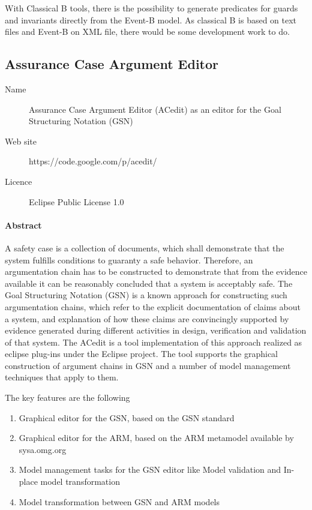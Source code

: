   With Classical B tools, there is the possibility to generate predicates for
  guards and invariants directly from the Event-B model. As classical B is based
  on text files and Event-B on XML file, there would be some development work to
  do.

\subsection{Assurance Case Argument Editor}

\begin{description}
\item[Name] Assurance Case Argument Editor (ACedit) as an editor for the Goal Structuring Notation (GSN)
\item[Web site] https://code.google.com/p/acedit/
\item[Licence] Eclipse Public License 1.0
\end{description}

\paragraph{Abstract}

A safety case is a collection of documents, which shall demonstrate that the system fulfills conditions to guaranty a safe behavior. Therefore, an argumentation chain has to be constructed to demonstrate that from the evidence available it can be reasonably concluded that a system is acceptably safe.  The Goal Structuring Notation (GSN) is a known  approach  for  constructing such argumentation chains, which refer to the explicit documentation of claims about a system,  and  explanation  of  how  these  claims  are  convincingly  supported  by evidence generated during different activities in design, verification and validation of that system.
The ACedit is a tool implementation of this approach realized as eclipse plug-ins under the Eclipse project. The tool supports the graphical construction of argument chains in GSN and a number of model management techniques that apply to them.

The key features are the following
\begin{enumerate}
\item Graphical editor for the GSN, based on the GSN standard
\item Graphical editor for the ARM, based on the ARM metamodel available by sysa.omg.org
\item Model management tasks for the GSN editor like Model validation and In-place model transformation 
\item Model transformation between GSN and ARM models 
\end{enumerate}
    

